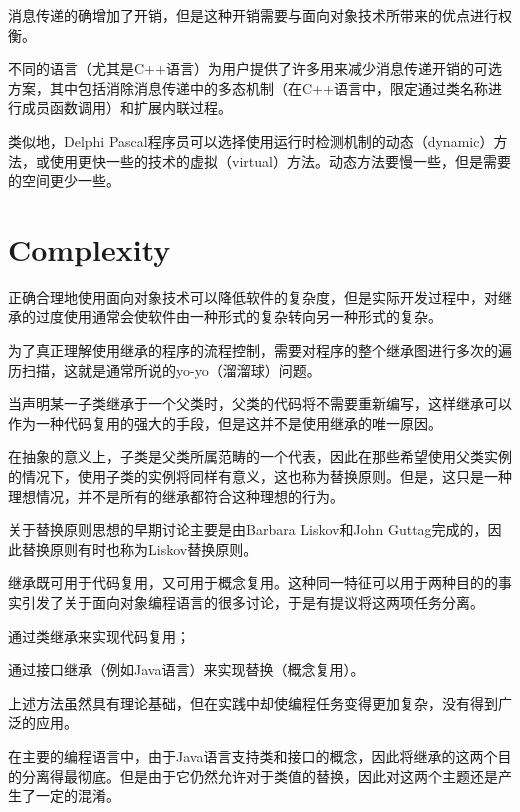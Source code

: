 消息传递的确增加了开销，但是这种开销需要与面向对象技术所带来的优点进行权衡。


不同的语言（尤其是C++语言）为用户提供了许多用来减少消息传递开销的可选方案，其中包括消除消息传递中的多态机制（在C++语言中，限定通过类名称进行成员函数调用）和扩展内联过程。

类似地，Delphi Pascal程序员可以选择使用运行时检测机制的动态（dynamic）方法，或使用更快一些的技术的虚拟（virtual）方法。动态方法要慢一些，但是需要的空间更少一些。

\section{Complexity}

正确合理地使用面向对象技术可以降低软件的复杂度，但是实际开发过程中，对继承的过度使用通常会使软件由一种形式的复杂转向另一种形式的复杂。

为了真正理解使用继承的程序的流程控制，需要对程序的整个继承图进行多次的遍历扫描，这就是通常所说的yo-yo（溜溜球）问题。

当声明某一子类继承于一个父类时，父类的代码将不需要重新编写，这样继承可以作为一种代码复用的强大的手段，但是这并不是使用继承的唯一原因。

在抽象的意义上，子类是父类所属范畴的一个代表，因此在那些希望使用父类实例的情况下，使用子类的实例将同样有意义，这也称为替换原则。但是，这只是一种理想情况，并不是所有的继承都符合这种理想的行为。

关于替换原则思想的早期讨论主要是由Barbara Liskov和John Guttag完成的，因此替换原则有时也称为Liskov替换原则。


继承既可用于代码复用，又可用于概念复用。这种同一特征可以用于两种目的的事实引发了关于面向对象编程语言的很多讨论，于是有提议将这两项任务分离。

\begin{compactitem}
\item 通过类继承来实现代码复用；
\item 通过接口继承（例如Java语言）来实现替换（概念复用）。
\end{compactitem}

上述方法虽然具有理论基础，但在实践中却使编程任务变得更加复杂，没有得到广泛的应用。

在主要的编程语言中，由于Java语言支持类和接口的概念，因此将继承的这两个目的分离得最彻底。但是由于它仍然允许对于类值的替换，因此对这两个主题还是产生了一定的混淆。

\begin{lstlisting}[language=C++]

\end{lstlisting}





